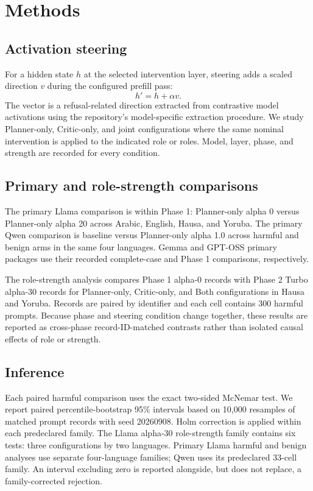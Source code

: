 \section{Methods}
\subsection{Activation steering}
For a hidden state $h$ at the selected intervention layer, steering adds a scaled direction $v$ during the configured prefill pass:
\begin{equation}
h'=h+\alpha v.
\end{equation}
The vector is a refusal-related direction extracted from contrastive model activations using the repository's model-specific extraction procedure. We study Planner-only, Critic-only, and joint configurations where the same nominal intervention is applied to the indicated role or roles. Model, layer, phase, and strength are recorded for every condition.

\subsection{Primary and role-strength comparisons}
The primary Llama comparison is within Phase 1: Planner-only alpha 0 versus Planner-only alpha 20 across Arabic, English, Hausa, and Yoruba. The primary Qwen comparison is baseline versus Planner-only alpha 1.0 across harmful and benign arms in the same four languages. Gemma and GPT-OSS primary packages use their recorded complete-case and Phase 1 comparisons, respectively.

The role-strength analysis compares Phase 1 alpha-0 records with Phase 2 Turbo alpha-30 records for Planner-only, Critic-only, and Both configurations in Hausa and Yoruba. Records are paired by identifier and each cell contains 300 harmful prompts. Because phase and steering condition change together, these results are reported as cross-phase record-ID-matched contrasts rather than isolated causal effects of role or strength.

\subsection{Inference}
Each paired harmful comparison uses the exact two-sided McNemar test. We report paired percentile-bootstrap 95\% intervals based on 10,000 resamples of matched prompt records with seed 20260908. Holm correction is applied within each predeclared family. The Llama alpha-30 role-strength family contains six tests: three configurations by two languages. Primary Llama harmful and benign analyses use separate four-language families; Qwen uses its predeclared 33-cell family. An interval excluding zero is reported alongside, but does not replace, a family-corrected rejection.

